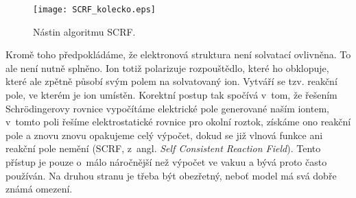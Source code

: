 \begin{itemize}
\begin{figure} [H]
\centering
\texttt{[image: SCRF\_kolecko.eps]}
\caption{Nástin algoritmu SCRF.}
\label{SCRF}
\end{figure}

\noindent Kromě toho předpokládáme, že elektronová struktura není solvatací ovlivněna. To ale není nutně splněno. Ion totiž polarizuje rozpouštědlo, které ho obklopuje, které ale zpětně působí svým polem na solvatovaný ion. Vytváří se tzv. reakční pole, ve kterém je ion umístěn. Korektní postup tak spočívá v~tom, že řešením Schr\"odingerovy rovnice vypočítáme elektrické pole generované naším iontem, v~tomto poli řešíme elektrostatické rovnice pro okolní roztok, získáme ono reakční pole a znovu znovu opakujeme celý výpočet, dokud se již vlnová funkce ani reakční pole nemění (SCRF, z~angl. \textit{Self Consistent Reaction Field}). Tento přístup je pouze o~málo náročnější než výpočet ve vakuu a bývá proto často používán. Na druhou stranu je třeba být obezřetný, neboť model má svá dobře známá omezení.        

     


\end{itemize}